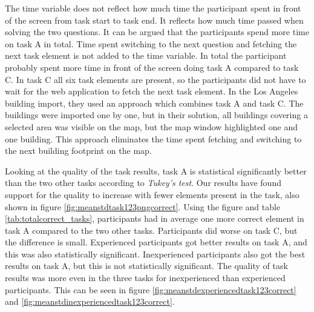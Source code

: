 The time variable does not reflect how much time the participant spent in front of the screen from task start to task end. It reflects how much time passed when solving the two questions. It can be argued that the participants spend more time on task A in total. Time spent switching to the next question and fetching the next task element is not added to the time variable. In total the participant probably spent more time in front of the screen doing task A compared to task C. In task C all six task elements are present, so the participants did not have to wait for the web application to fetch the next task element. In the Los Angeles building import, they used an approach which combines task A and task C. The buildings were imported one by one, but in their solution, all buildings covering a selected area was visible on the map, but the map window highlighted one and one building. This approach eliminates the time spent fetching and switching to the next building footprint on the map.  

Looking at the quality of the task results, task A is statistical significantly better than the two other tasks according to \textit{Tukey's test}. Our results have found support for the quality to increase with fewer elements present in the task, also shown in figure \ref{fig:meanstdtask123pngcorrect}. Using the figure and table \ref{tab:totalcorrect_tasks}, participants had in average one more correct element in task A compared to the two other tasks. Participants did worse on task C, but the difference is small. Experienced participants got better results on task A, and this was also statistically significant. Inexperienced participants also got the best results on task A, but this is not statistically significant. The quality of task results was more even in the three tasks for inexperienced than experienced participants. This can be seen in figure \ref{fig:meanstdexperiencedtask123correct} and \ref{fig:meanstdinexperiencedtask123correct}. 


